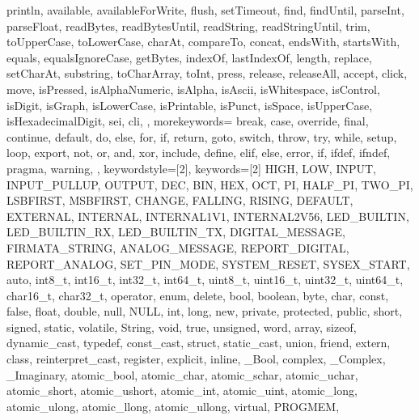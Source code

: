 {{                println, available, availableForWrite, flush, setTimeout, find, 
                findUntil, parseInt, parseFloat, readBytes, readBytesUntil, readString, 
                readStringUntil, trim, toUpperCase, toLowerCase, charAt, compareTo, 
                concat, endsWith, startsWith, equals, equalsIgnoreCase, getBytes, 
                indexOf, lastIndexOf, length, replace, setCharAt, substring, 
                toCharArray, toInt, press, release, releaseAll, accept, click, move, 
                isPressed, isAlphaNumeric, isAlpha, isAscii, isWhitespace, isControl, 
                isDigit, isGraph, isLowerCase, isPrintable, isPunct, isSpace, 
                isUpperCase, isHexadecimalDigit, sei, cli,
                }, 
  morekeywords={   %
                break, case, override, final, continue, default, do, else, for, 
                if, return, goto, switch, throw, try, while, setup, loop, export, 
                not, or, and, xor, include, define, elif, else, error, if, ifdef, 
                ifndef, pragma, warning,
                }, 
% 
%
  keywordstyle=[2]\color{arduinoBlue},   
  keywords=[2]{   %
                HIGH, LOW, INPUT, INPUT_PULLUP, OUTPUT, DEC, BIN, HEX, OCT, PI, 
                HALF_PI, TWO_PI, LSBFIRST, MSBFIRST, CHANGE, FALLING, RISING, 
                DEFAULT, EXTERNAL, INTERNAL, INTERNAL1V1, INTERNAL2V56, LED_BUILTIN, 
                LED_BUILTIN_RX, LED_BUILTIN_TX, DIGITAL_MESSAGE, FIRMATA_STRING, 
                ANALOG_MESSAGE, REPORT_DIGITAL, REPORT_ANALOG, SET_PIN_MODE, 
                SYSTEM_RESET, SYSEX_START, auto, int8_t, int16_t, int32_t, int64_t, 
                uint8_t, uint16_t, uint32_t, uint64_t, char16_t, char32_t, operator, 
                enum, delete, bool, boolean, byte, char, const, false, float, double, 
                null, NULL, int, long, new, private, protected, public, short, 
                signed, static, volatile, String, void, true, unsigned, word, array, 
                sizeof, dynamic_cast, typedef, const_cast, struct, static_cast, union, 
                friend, extern, class, reinterpret_cast, register, explicit, inline, 
                _Bool, complex, _Complex, _Imaginary, atomic_bool, atomic_char, 
                atomic_schar, atomic_uchar, atomic_short, atomic_ushort, atomic_int, 
                atomic_uint, atomic_long, atomic_ulong, atomic_llong, atomic_ullong, 
                virtual, PROGMEM,
}}
